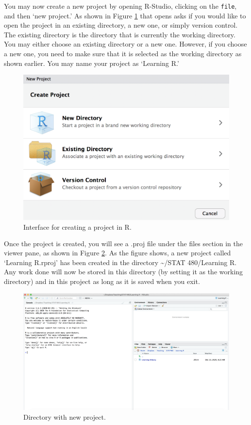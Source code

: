 \documentclass[]{book}
\begin{document}
You may now create a new project by opening R-Studio, clicking on the
\texttt{file}, and then `new project.' As shown in Figure
\ref{fig:newproj} that opens asks if you would like to open the project
in an existing directory, a new one, or simply version control. The
existing directory is the directory that is currently the working
directory. You may either choose an existing directory or a new one.
However, if you choose a new one, you need to make sure that it is
selected as the working directory as shown earlier. You may name your
project as `Learning R.'

\begin{figure}

{\centering \includegraphics[width=0.75\linewidth]{figures/newproj} 

}

\caption{Interface for creating a project in R.}\label{fig:newproj}
\end{figure}

Once the project is created, you will see a .proj file under the files
section in the viewer pane, as shown in Figure \ref{fig:newprojw}. As
the figure shows, a new project called `Learning R.rproj' has been
created in the directory \textasciitilde{}/STAT 480/Learning R. Any work
done will now be stored in this directory (by setting it as the working
directory) and in this project as long as it is saved when you exit.

\begin{figure}

{\centering \includegraphics[width=1\linewidth]{figures/newprojw} 

}

\caption{Directory with new project.}\label{fig:newprojw}
\end{figure}
\end{document}
